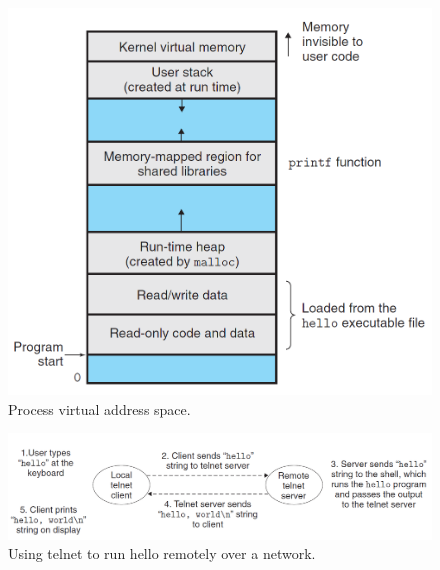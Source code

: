 \begin{figure}[h!]
    \centering
    \includegraphics[scale=0.5]{pic/section1and2/pic7.png}
    \caption{Process virtual address space.}
\end{figure}

\begin{figure}[h!]
    \centering
    \includegraphics[scale=0.4]{pic/section1and2/pic8.png}
    \caption{Using telnet to run hello remotely over a network.}
\end{figure}

